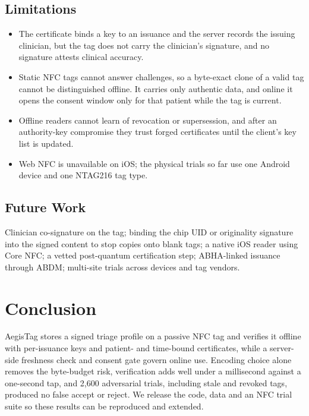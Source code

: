 \documentclass[conference]{IEEEtran}
\begin{document}
\subsection{Limitations}
\begin{itemize}
\item The certificate binds a key to an issuance and the server records the issuing clinician, but the tag does not carry the clinician's signature, and no signature attests clinical accuracy.
\item Static NFC tags cannot answer challenges, so a byte-exact clone of a valid tag cannot be distinguished offline. It carries only authentic data, and online it opens the consent window only for that patient while the tag is current.
\item Offline readers cannot learn of revocation or supersession, and after an authority-key compromise they trust forged certificates until the client's key list is updated.
\item Web NFC is unavailable on iOS; the physical trials so far use one Android device and one NTAG216 tag type.
\end{itemize}

\subsection{Future Work}
Clinician co-signature on the tag; binding the chip UID or originality signature into the signed content to stop copies onto blank tags; a native iOS reader using Core NFC; a vetted post-quantum certification step; ABHA-linked issuance through ABDM; multi-site trials across devices and tag vendors.

\section{Conclusion}
AegisTag stores a signed triage profile on a passive NFC tag and verifies it offline with per-issuance keys and patient- and time-bound certificates, while a server-side freshness check and consent gate govern online use. Encoding choice alone removes the byte-budget risk, verification adds well under a millisecond against a one-second tap, and 2{,}600 adversarial trials, including stale and revoked tags, produced no false accept or reject. We release the code, data and an NFC trial suite so these results can be reproduced and extended.
\end{document}
